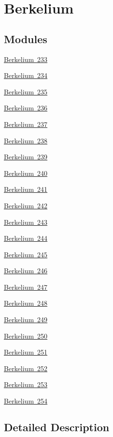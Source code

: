 \hypertarget{group___isotope_const-_berkelium}{}\section{Berkelium}
\label{group___isotope_const-_berkelium}
\subsection*{Modules}
\begin{DoxyCompactItemize}
\item 
\mbox{\hyperlink{group___isotope_const-_berkelium-_bk233}{Berkelium 233}}
\item 
\mbox{\hyperlink{group___isotope_const-_berkelium-_bk234}{Berkelium 234}}
\item 
\mbox{\hyperlink{group___isotope_const-_berkelium-_bk235}{Berkelium 235}}
\item 
\mbox{\hyperlink{group___isotope_const-_berkelium-_bk236}{Berkelium 236}}
\item 
\mbox{\hyperlink{group___isotope_const-_berkelium-_bk237}{Berkelium 237}}
\item 
\mbox{\hyperlink{group___isotope_const-_berkelium-_bk238}{Berkelium 238}}
\item 
\mbox{\hyperlink{group___isotope_const-_berkelium-_bk239}{Berkelium 239}}
\item 
\mbox{\hyperlink{group___isotope_const-_berkelium-_bk240}{Berkelium 240}}
\item 
\mbox{\hyperlink{group___isotope_const-_berkelium-_bk241}{Berkelium 241}}
\item 
\mbox{\hyperlink{group___isotope_const-_berkelium-_bk242}{Berkelium 242}}
\item 
\mbox{\hyperlink{group___isotope_const-_berkelium-_bk243}{Berkelium 243}}
\item 
\mbox{\hyperlink{group___isotope_const-_berkelium-_bk244}{Berkelium 244}}
\item 
\mbox{\hyperlink{group___isotope_const-_berkelium-_bk245}{Berkelium 245}}
\item 
\mbox{\hyperlink{group___isotope_const-_berkelium-_bk246}{Berkelium 246}}
\item 
\mbox{\hyperlink{group___isotope_const-_berkelium-_bk247}{Berkelium 247}}
\item 
\mbox{\hyperlink{group___isotope_const-_berkelium-_bk248}{Berkelium 248}}
\item 
\mbox{\hyperlink{group___isotope_const-_berkelium-_bk249}{Berkelium 249}}
\item 
\mbox{\hyperlink{group___isotope_const-_berkelium-_bk250}{Berkelium 250}}
\item 
\mbox{\hyperlink{group___isotope_const-_berkelium-_bk251}{Berkelium 251}}
\item 
\mbox{\hyperlink{group___isotope_const-_berkelium-_bk252}{Berkelium 252}}
\item 
\mbox{\hyperlink{group___isotope_const-_berkelium-_bk253}{Berkelium 253}}
\item 
\mbox{\hyperlink{group___isotope_const-_berkelium-_bk254}{Berkelium 254}}
\end{DoxyCompactItemize}


\subsection{Detailed Description}

